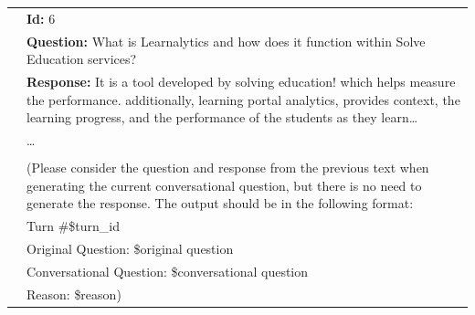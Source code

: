\documentclass[11pt]{article}
\begin{document}
{\begin{longtable}{c p{12cm}}
&\textbf{Id:} 6\\
&\textbf{Question:} What is Learnalytics and how does it function within Solve Education services? \\
&\textbf{Response:} It is a tool developed by solving education! which helps measure the performance.  additionally, learning portal analytics, provides context, the learning progress, and the performance of the students as they learn\dots\\
&\dots\\
\\
&(Please consider the question and response from the previous text when generating the current conversational question, but there is no need to generate the response. The output should be in the following format: \\
&Turn \#\$turn\_id \\ 
&Original Question: {\$original question} \\
&Conversational Question: {\$conversational question} \\ 
&Reason: {\$reason}) \\
\midrule


\end{longtable}}
\end{document}
